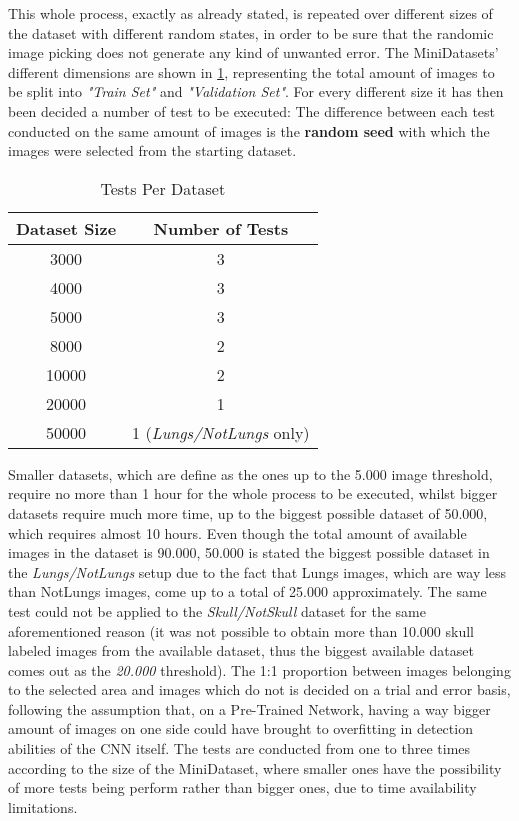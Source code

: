 \documentclass[../main.tex]{subfiles}
\begin{document}
This whole process, exactly as already stated, is repeated over different sizes of the dataset with different random states, in order to be sure that the randomic image picking does not generate any kind of unwanted error. The MiniDatasets' different dimensions are shown in \ref{tab:testsperdata}, representing the total amount of images to be split into \textit{"Train Set"} and \textit{"Validation Set"}. For every different size it has then been decided a number of test to be executed: The difference between each test conducted on the same amount of images is the \textbf{random seed} with which the images were selected from the starting dataset. 

\begin{table}
\centering

\caption{Tests Per Dataset}
\label{tab:testsperdata}

\begin{tabular}{|c|c|}
\hline
Dataset Size & Number of Tests            \\
\hline
3000         & 3                          \\
4000         & 3                          \\
5000         & 3                          \\
8000         & 2                          \\
10000        & 2                          \\
20000        & 1                          \\
50000        & 1 (\textit{Lungs/NotLungs} only)    \\
\hline
\end{tabular}
\end{table}

Smaller datasets, which are define as the ones up to the 5.000 image threshold, require no more than 1 hour for the whole process to be executed, whilst bigger datasets require much more time, up to the biggest possible dataset of 50.000, which requires almost 10 hours. Even though the total amount of available images in the dataset is 90.000, 50.000 is stated the biggest possible dataset in the \textit{Lungs/NotLungs} setup due to the fact that Lungs images, which are way less than NotLungs images, come up to a total of 25.000 approximately. The same test could not be applied to the \textit{Skull/NotSkull} dataset for the same aforementioned reason (it was not possible to obtain more than 10.000 skull labeled images from the available dataset, thus the biggest available dataset comes out as the \textit{20.000} threshold). The 1:1 proportion between images belonging to the selected area and images which do not is decided on a trial and error basis, following the assumption that, on a Pre-Trained Network, having a way bigger amount of images on one side could have brought to overfitting in detection abilities of the CNN itself. The tests are conducted from one to three times according to the size of the MiniDataset, where smaller ones have the possibility of more tests being perform rather than bigger ones, due to time availability limitations.
\end{document}
